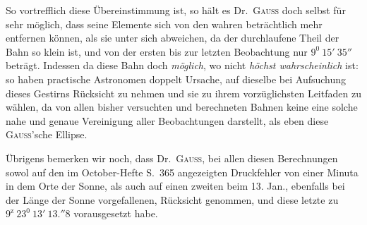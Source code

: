 %
So vortrefflich diese Übereinstimmung ist, so hält es Dr.\ \textsc{Gauss} doch selbst für sehr möglich, dass seine Elemente sich von den wahren beträchtlich mehr entfernen können, als sie unter sich abweichen, da der durchlaufene Theil der Bahn so klein ist, und von der ersten bis zur letzten Beobachtung nur $9^0\ 15'\ 35''$ beträgt. Indessen da diese Bahn doch \textit{möglich}, wo nicht \textit{höchst wahrscheinlich} ist: so haben practische Astronomen doppelt Ursache, auf dieselbe bei Aufsuchung dieses Gestirns Rücksicht zu nehmen und sie zu ihrem vorzüglichsten Leitfaden zu wählen, da von allen bisher versuchten und berechneten Bahnen keine eine solche nahe und genaue Vereinigung aller Beobachtungen darstellt, als eben diese \textsc{Gauss}'sche Ellipse.

Übrigens bemerken wir noch, dass Dr.\ \textsc{Gauss}, bei allen diesen Berechnungen sowol auf den im October-Hefte S.\ 365 angezeigten Druckfehler von einer Minuta in dem Orte der Sonne, als auch auf einen zweiten beim 13. Jan., ebenfalls bei der Länge der Sonne vorgefallenen, Rücksicht genommen, und diese letzte zu $9^{\mathrm z}\ 23^0\ 13'\ 13.''8$ vorausgesetzt habe.

